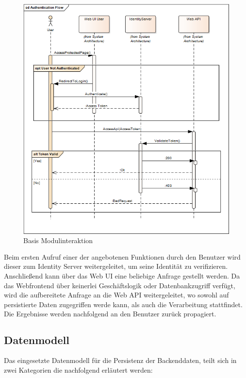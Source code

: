 \begin{figure}[h]
  \begin{center}
    \includegraphics[width=\textwidth]{./img/BackendModuleInteraction.png}
    \caption{Basis Modulinteraktion}
    \label{fig:backendModuleInteraction}
  \end{center}
\end{figure}

Beim ersten Aufruf einer der angebotenen Funktionen durch den Benutzer wird dieser zum Identity Server weitergeleitet, um seine Identität zu verifizieren. Anschließend kann über das Web UI eine beliebige Anfrage gestellt werden. Da das Webfrontend über keinerlei Geschäftslogik oder Datenbankzugriff verfügt, wird die aufbereitete Anfrage an die Web API weitergeleitet, wo sowohl auf persistierte Daten zugegriffen werde kann, als auch die Verarbeitung stattfindet. Die Ergebnisse werden nachfolgend an den Benutzer zurück propagiert. 

\subsection{Datenmodell}
Das eingesetzte Datenmodell für die Persistenz der Backenddaten, teilt sich in zwei Kategorien die nachfolgend erläutert werden:

